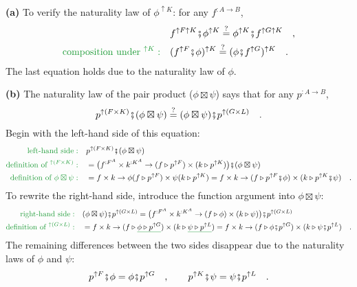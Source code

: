 \textbf{(a)} To verify the naturality law of $\phi^{\uparrow K}$:
for any $f^{:A\rightarrow B}$,
\begin{align*}
 & f^{\uparrow F\uparrow K}\bef\phi^{\uparrow K}\overset{?}{=}\phi^{\uparrow K}\bef f^{\uparrow G\uparrow K}\quad,\\
{\color{greenunder}\text{composition under }^{\uparrow K}:}\quad & (f^{\uparrow F}\bef\phi)^{\uparrow K}\overset{?}{=}(\phi\bef f^{\uparrow G})^{\uparrow K}\quad.
\end{align*}
The last equation holds due to the naturality law of $\phi$.

\textbf{(b)} The naturality law of the pair product ($\phi\boxtimes\psi$)
says that for any $p^{:A\rightarrow B}$,
\[
p^{\uparrow(F\times K)}\bef(\phi\boxtimes\psi)\overset{?}{=}(\phi\boxtimes\psi)\bef p^{\uparrow(G\times L)}\quad.
\]
Begin with the left-hand side of this equation:
\begin{align*}
{\color{greenunder}\text{left-hand side}:}\quad & p^{\uparrow(F\times K)}\bef(\phi\boxtimes\psi)\\
{\color{greenunder}\text{definition of }^{\uparrow(F\times K)}:}\quad & =\big(f^{:F^{A}}\times k^{:K^{A}}\rightarrow(f\triangleright p^{\uparrow F})\times(k\triangleright p^{\uparrow K})\big)\bef(\phi\boxtimes\psi)\\
{\color{greenunder}\text{definition of }\phi\boxtimes\psi:}\quad & =f\times k\rightarrow\phi(f\triangleright p^{\uparrow F})\times\psi(k\triangleright p^{\uparrow K})=f\times k\rightarrow(f\triangleright p^{\uparrow F}\bef\phi)\times(k\triangleright p^{\uparrow K}\bef\psi)\quad.
\end{align*}
To rewrite the right-hand side, introduce the function argument into
$\phi\boxtimes\psi$:
\begin{align*}
{\color{greenunder}\text{right-hand side}:}\quad & (\phi\boxtimes\psi)\bef p^{\uparrow(G\times L)}=\big(f^{:F^{A}}\times k^{:K^{A}}\rightarrow(f\triangleright\phi)\times(k\triangleright\psi)\big)\bef p^{\uparrow(G\times L)}\\
{\color{greenunder}\text{definition of }^{\uparrow(G\times L)}:}\quad & =f\times k\rightarrow(f\triangleright\gunderline{\phi\triangleright p^{\uparrow G}})\times(k\triangleright\gunderline{\psi\triangleright p^{\uparrow L}})=f\times k\rightarrow(f\triangleright\phi\bef p^{\uparrow G})\times(k\triangleright\psi\bef p^{\uparrow L})\quad.
\end{align*}
The remaining differences between the two sides disappear due to the
naturality laws of $\phi$ and $\psi$:
\[
p^{\uparrow F}\bef\phi=\phi\bef p^{\uparrow G}\quad,\quad\quad p^{\uparrow K}\bef\psi=\psi\bef p^{\uparrow L}\quad.
\]

